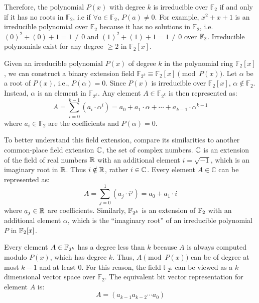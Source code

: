 Therefore, the polynomial $P(x)$ with degree $k$ is irreducible over 
$\mathbb{F}_{2}$ if and only if it has no roots in $\mathbb{F}_{2}$,
i.e if $\forall a \in \mathbb{F}_{2}$, $P(a)\neq 0$.
For example, $x^2+x+1$ is an irreducible polynomial over $\mathbb{F}_{2}$
because it has no solutions in $\mathbb{F}_{2}$, i.e. $(0)^2+(0)+1=1\neq0$ 
and $(1)^2+(1)+1=1\neq0$ over ${\mathbb{F}}_2$.
Irreducible polynomials exist for any degree $\geq 2$ in $\mathbb{F}_2[x]$.

Given an irreducible polynomial $P(x)$ of degree $k$ in the polynomial ring 
$\mathbb{F}_2[x]$, we can construct a binary extension field 
$\mathbb{F}_{2^k} \equiv \mathbb{F}_2[x] \pmod{P(x)}$.
Let $\alpha$ be a root of $P(x)$, i.e., $P(\alpha)=0$.
Since $P(x)$ is irreducible over
$\mathbb{F}_2[x]$, $\alpha \notin \mathbb{F}_2$. 
Instead, $\alpha$ is an element in $\mathbb{F}_{2^k}$. 
Any element $A \in \mathbb{F}_{2^k}$ is then represented as: 
\begin{equation}\label{rep:poly}
A= \sum_{i=0}^{k-1} (a_i \cdot \alpha^i) = a_0 + a_1\cdot\alpha + \cdots + a_{k-1}\cdot \alpha^{k-1}\nonumber
\end{equation}
where $a_i \in \mathbb{F}_2$ are the coefficients and $P(\alpha)=0$.

To better understand this field extension, compare its similarities to another
common-place
field extension ${\mathbb{C}}$, the set of complex numbers. ${\mathbb{C}}$ is an extension of the field 
of real numbers ${\mathbb{R}}$ with an additional element $i=\sqrt{-1}$, which is an imaginary
root in ${\mathbb{R}}$.
Thus $i \notin {\mathbb{R}}$, rather $i \in {\mathbb{C}}$.
Every element $A \in \mathbb{C}$ can be represented as:
\begin{equation}\label{rep:polyC}
A=\sum_{j=0}^{1} (a_j \cdot i^j)=a_0+a_1\cdot i
\end{equation}
where $a_j \in {\mathbb{R}}$ are coefficients. Similarly, ${\mathbb{F}}_{2^k}$ is an extension of ${\mathbb{F}}_2$ with 
an additional element $\alpha$, which is the ``imaginary root'' of an irreducible 
polynomial $P$ in ${\mathbb{F}}_2[x]$.

Every element $A \in {\mathbb{F}}_{2^k}$ has a degree less than $k$ because 
$A$ is always computed modulo $P(x)$, which has degree $k$. 
Thus, $A\pmod {P(x)}$ can be of degree at most $k-1$ and at least $0$.
For this reason, the field $\mathbb{F}_{2^k}$ can be viewed as a $k$
dimensional vector space over $\mathbb{F}_{2}$. 
The equivalent bit vector representation for element $A$ is:
\begin{equation}
A=(a_{k-1} a_{k-2} \cdots a_{0})
\end{equation}

